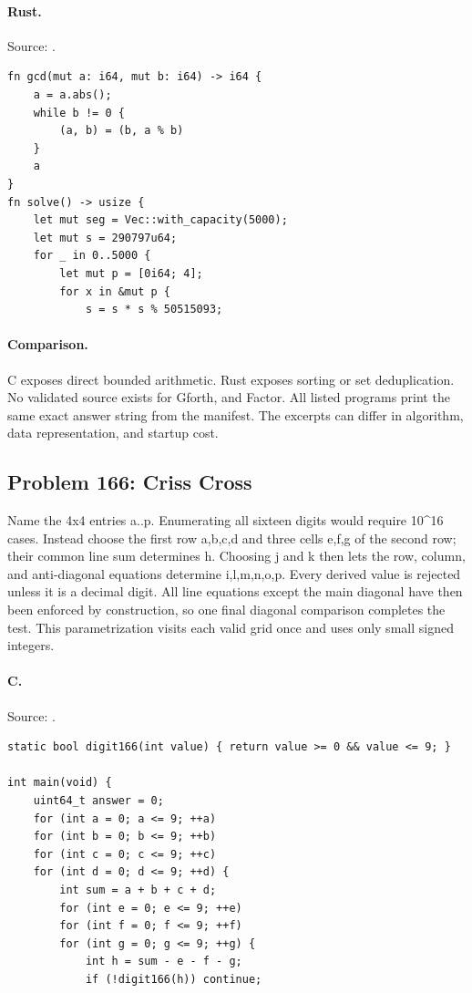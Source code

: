 \paragraph{Rust.} Source: .
\begin{lstlisting}
fn gcd(mut a: i64, mut b: i64) -> i64 {
    a = a.abs();
    while b != 0 {
        (a, b) = (b, a % b)
    }
    a
}
fn solve() -> usize {
    let mut seg = Vec::with_capacity(5000);
    let mut s = 290797u64;
    for _ in 0..5000 {
        let mut p = [0i64; 4];
        for x in &mut p {
            s = s * s % 50515093;
\end{lstlisting}

\paragraph{Comparison.}
C exposes direct bounded arithmetic. Rust exposes sorting or set deduplication.
No validated source exists for Gforth, and Factor.
All listed programs print the same exact answer string from the manifest. The excerpts can differ in algorithm, data representation, and startup cost.

\subsection{Problem 166: Criss Cross}
\label{walkthrough:p166}
Name the 4x4 entries a..p. Enumerating all sixteen digits would require 10\textasciicircum{}16 cases. Instead choose the first row a,b,c,d and three cells e,f,g of the second row; their common line sum determines h. Choosing j and k then lets the row, column, and anti-diagonal equations determine i,l,m,n,o,p. Every derived value is rejected unless it is a decimal digit. All line equations except the main diagonal have then been enforced by construction, so one final diagonal comparison completes the test. This parametrization visits each valid grid once and uses only small signed integers.

\paragraph{C.} Source: .
\begin{lstlisting}
static bool digit166(int value) { return value >= 0 && value <= 9; }

int main(void) {
    uint64_t answer = 0;
    for (int a = 0; a <= 9; ++a)
    for (int b = 0; b <= 9; ++b)
    for (int c = 0; c <= 9; ++c)
    for (int d = 0; d <= 9; ++d) {
        int sum = a + b + c + d;
        for (int e = 0; e <= 9; ++e)
        for (int f = 0; f <= 9; ++f)
        for (int g = 0; g <= 9; ++g) {
            int h = sum - e - f - g;
            if (!digit166(h)) continue;
\end{lstlisting}

